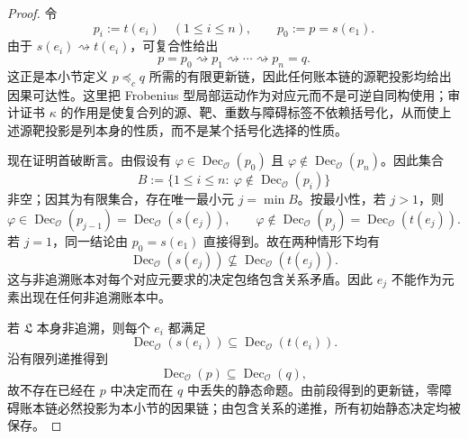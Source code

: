 \begin{proof}
令
\[
p_i:=t(e_i)\quad (1\le i\le n),\qquad p_0:=p=s(e_1).
\]
由于 \(s(e_i)\rightsquigarrow t(e_i)\)，可复合性给出
\[
p=p_0\rightsquigarrow p_1\rightsquigarrow\cdots\rightsquigarrow p_n=q.
\]
这正是本小节定义 \(p\preceq_c q\) 所需的有限更新链，因此任何账本链的源靶投影均给出因果可达性。这里把 Frobenius 型局部运动作为对应元而不是可逆自同构使用；审计证书 \(\kappa\) 的作用是使复合列的源、靶、重数与障碍标签不依赖括号化，从而使上述源靶投影是列本身的性质，而不是某个括号化选择的性质。

现在证明首破断言。由假设有 \(\varphi\in\operatorname{Dec}_{\mathcal O}(p_0)\) 且 \(\varphi\notin\operatorname{Dec}_{\mathcal O}(p_n)\)。因此集合
\[
B:=\{1\le i\le n:\ \varphi\notin\operatorname{Dec}_{\mathcal O}(p_i)\}
\]
非空；因其为有限集合，存在唯一最小元 \(j=\min B\)。按最小性，若 \(j>1\)，则
\[
\varphi\in\operatorname{Dec}_{\mathcal O}(p_{j-1})=\operatorname{Dec}_{\mathcal O}(s(e_j)),\qquad
\varphi\notin\operatorname{Dec}_{\mathcal O}(p_j)=\operatorname{Dec}_{\mathcal O}(t(e_j)).
\]
若 \(j=1\)，同一结论由 \(p_0=s(e_1)\) 直接得到。故在两种情形下均有
\[
\operatorname{Dec}_{\mathcal O}(s(e_j))\nsubseteq
\operatorname{Dec}_{\mathcal O}(t(e_j)).
\]
这与非追溯账本对每个对应元要求的决定包络包含关系矛盾。因此 \(e_j\) 不能作为元素出现在任何非追溯账本中。

若 \(\mathfrak L\) 本身非追溯，则每个 \(e_i\) 都满足
\[
\operatorname{Dec}_{\mathcal O}(s(e_i))\subseteq
\operatorname{Dec}_{\mathcal O}(t(e_i)).
\]
沿有限列递推得到
\[
\operatorname{Dec}_{\mathcal O}(p)\subseteq
\operatorname{Dec}_{\mathcal O}(q),
\]
故不存在已经在 \(p\) 中决定而在 \(q\) 中丢失的静态命题。由前段得到的更新链，零障碍账本链必然投影为本小节的因果链；由包含关系的递推，所有初始静态决定均被保存。
\end{proof}
